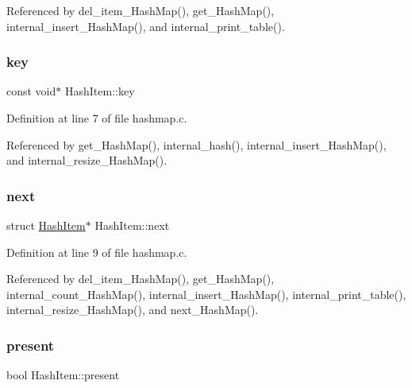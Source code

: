 Referenced by del\+\_\+item\+\_\+\+Hash\+Map(), get\+\_\+\+Hash\+Map(), internal\+\_\+insert\+\_\+\+Hash\+Map(), and internal\+\_\+print\+\_\+table().

\mbox{\label{structHashItem_a0bd79196ef574b956a40b009950a1ef4}} 
\subsubsection{\texorpdfstring{key}{key}}
{\footnotesize\ttfamily const void$\ast$ Hash\+Item\+::key}



Definition at line 7 of file hashmap.\+c.



Referenced by get\+\_\+\+Hash\+Map(), internal\+\_\+hash(), internal\+\_\+insert\+\_\+\+Hash\+Map(), and internal\+\_\+resize\+\_\+\+Hash\+Map().

\mbox{\label{structHashItem_a623917e154bb2a360da5cbc9d3329171}} 
\subsubsection{\texorpdfstring{next}{next}}
{\footnotesize\ttfamily struct \mbox{\hyperlink{structHashItem}{Hash\+Item}}$\ast$ Hash\+Item\+::next}



Definition at line 9 of file hashmap.\+c.



Referenced by del\+\_\+item\+\_\+\+Hash\+Map(), get\+\_\+\+Hash\+Map(), internal\+\_\+count\+\_\+\+Hash\+Map(), internal\+\_\+insert\+\_\+\+Hash\+Map(), internal\+\_\+print\+\_\+table(), internal\+\_\+resize\+\_\+\+Hash\+Map(), and next\+\_\+\+Hash\+Map().

\mbox{\label{structHashItem_a7fe892239fc6fb4cef7e2f2cf1581b1f}} 
\subsubsection{\texorpdfstring{present}{present}}
{\footnotesize\ttfamily bool Hash\+Item\+::present}



